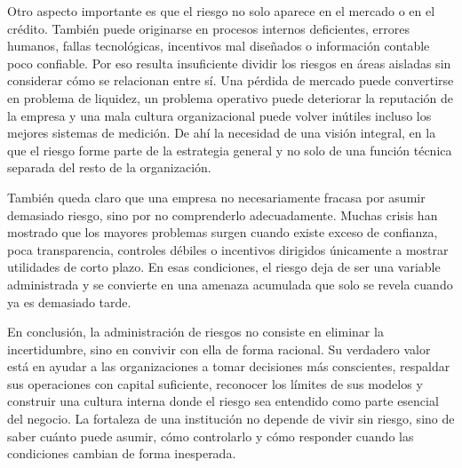 Otro aspecto importante es que el riesgo no solo aparece en el mercado o en el cr\'edito. Tambi\'en puede originarse en procesos internos deficientes, errores humanos, fallas tecnol\'ogicas, incentivos mal dise\~nados o informaci\'on contable poco confiable. Por eso resulta insuficiente dividir los riesgos en \'areas aisladas sin considerar c\'omo se relacionan entre s\'i. Una p\'erdida de mercado puede convertirse en problema de liquidez, un problema operativo puede deteriorar la reputaci\'on de la empresa y una mala cultura organizacional puede volver in\'utiles incluso los mejores sistemas de medici\'on. De ah\'i la necesidad de una visi\'on integral, en la que el riesgo forme parte de la estrategia general y no solo de una funci\'on t\'ecnica separada del resto de la organizaci\'on.

Tambi\'en queda claro que una empresa no necesariamente fracasa por asumir demasiado riesgo, sino por no comprenderlo adecuadamente. Muchas crisis han mostrado que los mayores problemas surgen cuando existe exceso de confianza, poca transparencia, controles d\'ebiles o incentivos dirigidos \'unicamente a mostrar utilidades de corto plazo. En esas condiciones, el riesgo deja de ser una variable administrada y se convierte en una amenaza acumulada que solo se revela cuando ya es demasiado tarde.

En conclusi\'on, la administraci\'on de riesgos no consiste en eliminar la incertidumbre, sino en convivir con ella de forma racional. Su verdadero valor est\'a en ayudar a las organizaciones a tomar decisiones m\'as conscientes, respaldar sus operaciones con capital suficiente, reconocer los l\'imites de sus modelos y construir una cultura interna donde el riesgo sea entendido como parte esencial del negocio. La fortaleza de una instituci\'on no depende de vivir sin riesgo, sino de saber cu\'anto puede asumir, c\'omo controlarlo y c\'omo responder cuando las condiciones cambian de forma inesperada.